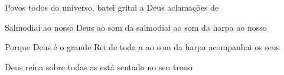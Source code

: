 \begin{greenumerate}
  \item {}Povos todos do universo, batei  gritai a Deus aclamações de 

  \item {}Salmodiai ao nosso Deus ao som da  salmodiai ao som da harpa ao nosso 

  \item {}Porque Deus é o grande Rei de toda a  ao som da harpa acompanhai os seus 

  \item {}Deus reina sobre todas as  está sentado no seu trono 
\end{greenumerate}
